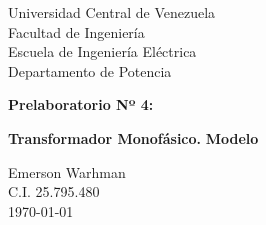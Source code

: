 \begin{titlepage}
    \centering
    \Large
    Universidad Central de Venezuela\\
    Facultad de Ingeniería\\
    Escuela de Ingeniería Eléctrica\\
    Departamento de Potencia
    \vspace*{8cm}

    \Huge
    \textbf{Prelaboratorio Nº 4:}

    \textbf{Transformador Monofásico.}
    \textbf{Modelo}
    \vfill


    \Large

    Emerson Warhman \\
    C.I. 25.795.480 \\
    \today

\end{titlepage}
